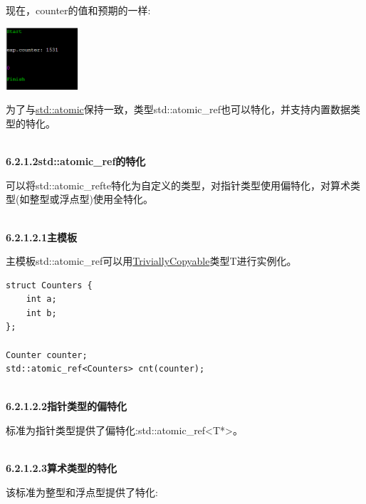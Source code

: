 现在，counter的值和预期的一样:

\begin{center}
\includegraphics[width=0.2\textwidth]{content/3/chapter6/images/10.png}\\
\end{center}

为了与\href{https://en.cppreference.com/w/cpp/atomic/atomic}{std::atomic}保持一致，类型std::atomic\_ref也可以特化，并支持内置数据类型的特化。

\hspace*{\fill} \\ %
\noindent
\textbf{6.2.1.2\hspace{0.2cm}std::atomic\_ref的特化}

可以将std::atomic\_refte特化为自定义的类型，对指针类型使用偏特化，对算术类型(如整型或浮点型)使用全特化。

\hspace*{\fill} \\ %
\noindent
\textbf{6.2.1.2.1\hspace{0.2cm}主模板}

主模板std::atomic\_ref可以用\href{https://en.cppreference.com/w/cpp/types/is_trivially_copyable}{TriviallyCopyable}类型T进行实例化。

\begin{lstlisting}[style=styleCXX]
struct Counters {
	int a;
	int b;
};

Counter counter;
std::atomic_ref<Counters> cnt(counter);
\end{lstlisting}

\hspace*{\fill} \\ %
\noindent
\textbf{6.2.1.2.2\hspace{0.2cm}指针类型的偏特化}

标准为指针类型提供了偏特化:std::atomic\_ref<T*>。

\hspace*{\fill} \\ %
\noindent
\textbf{6.2.1.2.3\hspace{0.2cm}算术类型的特化}

该标准为整型和浮点型提供了特化:

